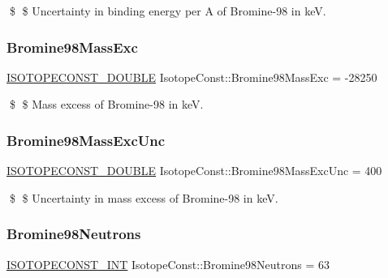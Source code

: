 \$ \$ Uncertainty in binding energy per A of Bromine-\/98 in keV. \mbox{\label{group___isotope_const-_bromine-_br98_gaa92f2672e5c2530a5bc13a5a1912d211}} 
\subsubsection{\texorpdfstring{Bromine98\+Mass\+Exc}{Bromine98MassExc}}
{\footnotesize\ttfamily \mbox{\hyperlink{group___isotope_const-_macros_ga8f45a7272ce02c0b4c65c44636ed719a}{I\+S\+O\+T\+O\+P\+E\+C\+O\+N\+S\+T\+\_\+\+D\+O\+U\+B\+LE}} Isotope\+Const\+::\+Bromine98\+Mass\+Exc = -\/28250}

\$ \$ Mass excess of Bromine-\/98 in keV. \mbox{\label{group___isotope_const-_bromine-_br98_ga18e634f9e4cd9b0c930049d73288ddd9}} 
\subsubsection{\texorpdfstring{Bromine98\+Mass\+Exc\+Unc}{Bromine98MassExcUnc}}
{\footnotesize\ttfamily \mbox{\hyperlink{group___isotope_const-_macros_ga8f45a7272ce02c0b4c65c44636ed719a}{I\+S\+O\+T\+O\+P\+E\+C\+O\+N\+S\+T\+\_\+\+D\+O\+U\+B\+LE}} Isotope\+Const\+::\+Bromine98\+Mass\+Exc\+Unc = 400}

\$ \$ Uncertainty in mass excess of Bromine-\/98 in keV. \mbox{\label{group___isotope_const-_bromine-_br98_ga07e4261f98331ec0d9589722054b2b31}} 
\subsubsection{\texorpdfstring{Bromine98\+Neutrons}{Bromine98Neutrons}}
{\footnotesize\ttfamily \mbox{\hyperlink{group___isotope_const-_macros_ga5f18360b3e99483a35c32d789e62621c}{I\+S\+O\+T\+O\+P\+E\+C\+O\+N\+S\+T\+\_\+\+I\+NT}} Isotope\+Const\+::\+Bromine98\+Neutrons = 63}

